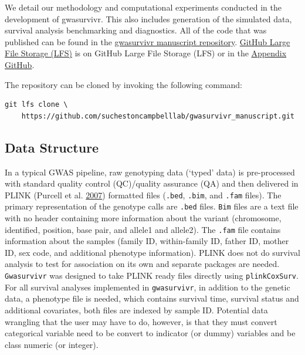 \documentclass[]{DissertateOSU}
\begin{document}
We detail our methodology and computational experiments conducted in the
development of gwasurvivr. This also includes generation of the
simulated data, survival analysis benchmarking and diagnostics. All of
the code that was published can be found in the
\href{https://github.com/suchestoncampbelllab/gwasurvivr_manuscript}{gwasurvivr
manuscript repository}. \href{https://git-lfs.github.com/}{GitHub Large
File Storage (LFS)} is on GitHub Large File Storage (LFS) or in the
\href{https://github.com/aarizvi/dissertation/tree/master/code/chapter3}{Appendix
GitHub}.

The repository can be cloned by invoking the following command:

\singlespacing

\begin{verbatim}
git lfs clone \    
    https://github.com/suchestoncampbelllab/gwasurvivr_manuscript.git
\end{verbatim}

\doublespacing

\subsection{Data Structure}\label{data-structure}

In a typical GWAS pipeline, raw genotyping data (`typed' data) is
pre-processed with standard quality control (QC)/quality assurance (QA)
and then delivered in PLINK (Purcell et al.
\protect\hyperlink{ref-plink}{2007}) formatted files (\texttt{.bed},
\texttt{.bim}, and \texttt{.fam} files). The primary representation of
the genotype calls are \texttt{.bed} files. \texttt{Bim} files are a
text file with no header containing more information about the variant
(chromosome, identified, position, base pair, and allele1 and allele2).
The \texttt{.fam} file contains information about the samples (family
ID, within-family ID, father ID, mother ID, sex code, and additional
phenotype information). PLINK does not do survival analysis to test for
association on its own and separate packages are needed.
\texttt{Gwasurvivr} was designed to take PLINK ready files directly
using \texttt{plinkCoxSurv}. For all survival analyses implemented in
\texttt{gwasurvivr}, in addition to the genetic data, a phenotype file
is needed, which contains survival time, survival status and additional
covariates, both files are indexed by sample ID. Potential data
wrangling that the user may have to do, however, is that they must
convert categorical variable need to be convert to indicator (or dummy)
variables and be class numeric (or integer).
\end{document}
